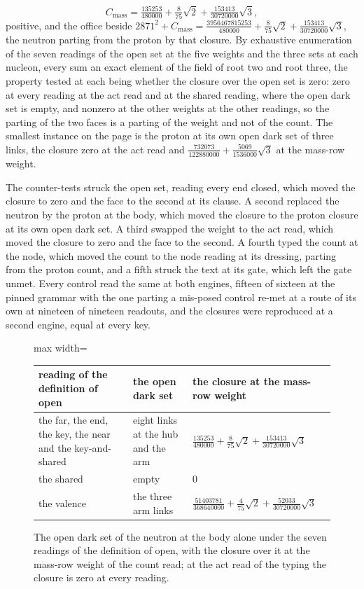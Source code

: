 \begin{chproof}
\begin{equation}
C_{\mathrm{mass}} = \tfrac{135253}{480000} + \tfrac{8}{75}\sqrt{2} + \tfrac{153413}{30720000}\sqrt{3} ,
\end{equation}
positive, and the office beside $2871^{2} + C_{\mathrm{mass}} = \tfrac{3956467815253}{480000} + \tfrac{8}{75}\sqrt{2} + \tfrac{153413}{30720000}\sqrt{3}$, the neutron parting from the proton by that closure. By exhaustive enumeration of the seven readings of the open set at the five weights and the three sets at each nucleon, every sum an exact element of the field of root two and root three, the property tested at each being whether the closure over the open set is zero: zero at every reading at the act read and at the shared reading, where the open dark set is empty, and nonzero at the other weights at the other readings, so the parting of the two faces is a parting of the weight and not of the count. The smallest instance on the page is the proton at its own open dark set of three links, the closure zero at the act read and $\tfrac{732073}{122880000} + \tfrac{5069}{1536000}\sqrt{3}$ at the mass-row weight.

The counter-tests struck the open set, reading every end closed, which moved the closure to zero and the face to the second at its clause. A second replaced the neutron by the proton at the body, which moved the closure to the proton closure at its own open dark set. A third swapped the weight to the act read, which moved the closure to zero and the face to the second. A fourth typed the count at the node, which moved the count to the node reading at its dressing, parting from the proton count, and a fifth struck the text at its gate, which left the gate unmet. Every control read the same at both engines, fifteen of sixteen at the pinned grammar with the one parting a mis-posed control re-met at a route of its own at nineteen of nineteen readouts, and the closures were reproduced at a second engine, equal at every key.
\end{chproof}
\begin{figure}[h]\centering
\begin{adjustbox}{max width=\linewidth}\begin{tabular}{lll}\toprule
reading of the definition of open & the open dark set & the closure at the mass-row weight \\ \midrule
the far, the end, the key, the near and the key-and-shared & eight links at the hub and the arm & $\tfrac{135253}{480000} + \tfrac{8}{75}\sqrt{2} + \tfrac{153413}{30720000}\sqrt{3}$ \\
the shared & empty & $0$ \\
the valence & the three arm links & $\tfrac{51403781}{368640000} + \tfrac{4}{75}\sqrt{2} + \tfrac{52033}{30720000}\sqrt{3}$ \\ \bottomrule
\end{tabular}\end{adjustbox}
\caption{The open dark set of the neutron at the body alone under the seven readings of the definition of open, with the closure over it at the mass-row weight of the count read; at the act read of the typing the closure is zero at every reading.}
\end{figure}
